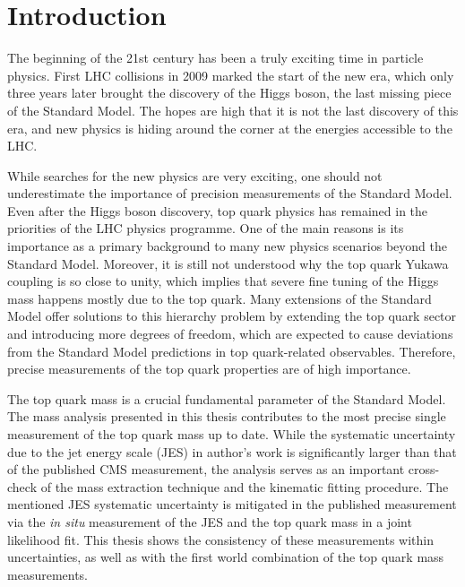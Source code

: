 
\chapter{Introduction}
\label{c:intro}
\ifpdf
    \graphicspath{{01_Introduction/plots/}}
\else
    \graphicspath{{01_Introduction/plots/EPS/}{01_Introduction/plots/}}
\fi

The beginning of the 21st century has been a truly exciting time in particle physics. First LHC collisions in 2009
marked the start of the new era, which only three years later brought the discovery of the Higgs boson, the last missing
piece of the Standard Model. The hopes are high that it is not the last discovery of this era, and new physics is hiding
around the corner at the energies accessible to the LHC.

While searches for the new physics are very exciting, one should not underestimate the importance of precision
measurements of the Standard Model. Even after the Higgs boson discovery, top quark physics has remained in the
priorities of the LHC physics programme. One of the main reasons is its importance as a primary background to many new
physics scenarios beyond the Standard Model. Moreover, it is still not understood why the top quark Yukawa coupling is
so close to unity, which implies that severe fine tuning of the Higgs mass happens mostly due to the top quark. Many
extensions of the Standard Model offer solutions to this hierarchy problem by extending the top quark sector and
introducing more degrees of freedom, which are expected to cause deviations from the Standard Model predictions in top
quark-related observables. Therefore, precise measurements of the top quark properties are of high importance.

The top quark mass is a crucial fundamental parameter of the Standard Model. The mass analysis presented in this thesis
contributes to the most precise single measurement of the top quark mass up to date. While the systematic uncertainty
due to the jet energy scale (JES) in author's work is significantly larger than that of the published CMS measurement,
the analysis serves as an important cross-check of the mass extraction technique and the kinematic fitting procedure.
The mentioned JES systematic uncertainty is mitigated in the published measurement via the \textit{in situ} measurement
of the JES and the top quark mass in a joint likelihood fit. This thesis shows the consistency of these measurements
within uncertainties, as well as with the first world combination of the top quark mass measurements.

